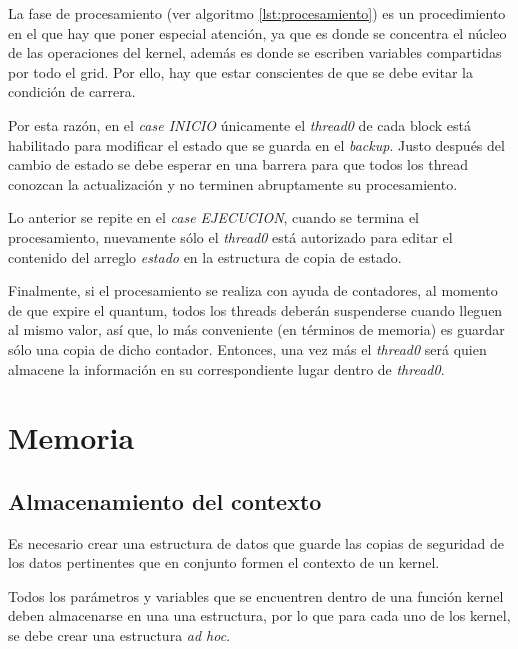 La fase de procesamiento (ver algoritmo \ref{lst:procesamiento}) es un procedimiento en el que hay que poner especial atención, ya que es donde se concentra el núcleo de las operaciones del kernel, además es donde se escriben variables compartidas por todo el grid. Por ello, hay que estar conscientes de que se debe evitar la condición de carrera.
\newline

Por esta razón, en el \textit{case INICIO} únicamente el \textit{thread0} de cada block está habilitado para modificar el estado que se guarda en el \textit{backup}. Justo después del cambio de estado se debe esperar en una barrera para que todos los thread conozcan la actualización y no terminen abruptamente su procesamiento.
\newline

Lo anterior se repite en el \textit{case EJECUCION}, cuando se termina el procesamiento, nuevamente sólo el \textit{thread0} está autorizado para editar el contenido del arreglo \textit{estado} en la estructura de copia de estado.
\newline

Finalmente, si el procesamiento se realiza con ayuda de contadores, al momento de que expire el quantum, todos los threads deberán suspenderse cuando lleguen al mismo valor, así que, lo más conveniente (en términos de memoria) es guardar sólo una copia de dicho contador. Entonces, una vez más el \textit{thread0} será quien almacene la información en su correspondiente lugar dentro de \textit{thread0}.


  \section{Memoria}\label{secc:memoria}

  \subsection{Almacenamiento del contexto}

Es necesario crear una estructura de datos que guarde las copias de seguridad de los datos pertinentes que en conjunto formen el contexto de un kernel.
\newline

Todos los parámetros y variables que se encuentren dentro de una función kernel deben almacenarse en una una estructura, por lo que para cada uno de los kernel, se debe crear una estructura \textit{ad hoc}.
\newline

